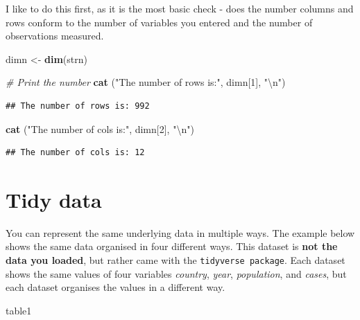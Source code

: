 \documentclass[
]{book}
\newenvironment{Shaded}{\begin{snugshade}}{\end{snugshade}}
\newcommand{\CharTok}[1]{\textcolor[rgb]{0.31,0.60,0.02}{#1}}
\newcommand{\CommentTok}[1]{\textcolor[rgb]{0.56,0.35,0.01}{\textit{#1}}}
\newcommand{\DecValTok}[1]{\textcolor[rgb]{0.00,0.00,0.81}{#1}}
\newcommand{\KeywordTok}[1]{\textcolor[rgb]{0.13,0.29,0.53}{\textbf{#1}}}
\newcommand{\NormalTok}[1]{#1}
\newcommand{\StringTok}[1]{\textcolor[rgb]{0.31,0.60,0.02}{#1}}
\begin{document}
I like to do this first, as it is the most basic check - does the number columns and rows conform to the number of variables you entered and the number of observations measured.

\begin{Shaded}
\begin{Highlighting}[]
\NormalTok{dimn <-}\StringTok{ }\KeywordTok{dim}\NormalTok{(strn)}

\CommentTok{# Print the number }
\KeywordTok{cat}\NormalTok{ (}\StringTok{"The number of rows is:"}\NormalTok{,  dimn[}\DecValTok{1}\NormalTok{], }\StringTok{"}\CharTok{\textbackslash{}n}\StringTok{"}\NormalTok{)}
\end{Highlighting}
\end{Shaded}

\begin{verbatim}
## The number of rows is: 992
\end{verbatim}

\begin{Shaded}
\begin{Highlighting}[]
\KeywordTok{cat}\NormalTok{ (}\StringTok{"The number of cols is:"}\NormalTok{,  dimn[}\DecValTok{2}\NormalTok{], }\StringTok{"}\CharTok{\textbackslash{}n}\StringTok{"}\NormalTok{)}
\end{Highlighting}
\end{Shaded}

\begin{verbatim}
## The number of cols is: 12
\end{verbatim}

\hypertarget{tidy-data}{%
\section{Tidy data}\label{tidy-data}}

You can represent the same underlying data in multiple ways. The example below shows the same data organised in four different ways. This dataset is \textbf{not the data you loaded}, but rather came with the \texttt{tidyverse\ package}. Each dataset shows the same values of four variables \emph{country}, \emph{year}, \emph{population}, and \emph{cases}, but each dataset organises the values in a different way.

\begin{Shaded}
\begin{Highlighting}[]
\NormalTok{table1}
\end{Highlighting}
\end{Shaded}
\end{document}
